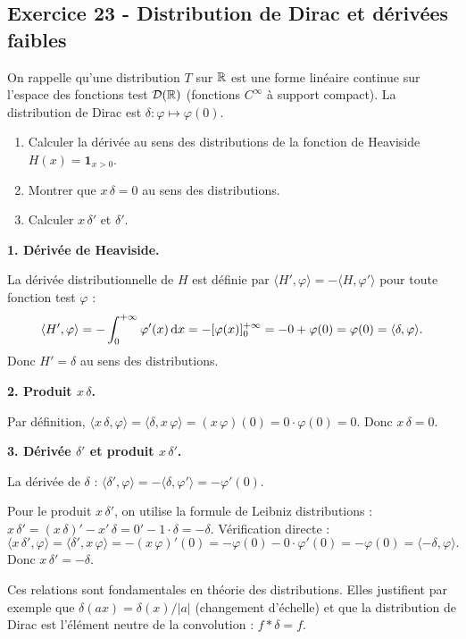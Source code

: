 \documentclass[12pt,a4paper]{article}
\begin{document}
\begin{boitecorrige}
\end{boitecorrige}

\subsection*{Exercice 23 - Distribution de Dirac et dérivées faibles \niveau{\difficile}}

\begin{boiteexercice}
On rappelle qu'une distribution $T$ sur $\mathbb{R}$ est une forme linéaire continue sur l'espace des fonctions test $\mathcal{D}(\mathbb{R})$ (fonctions $C^\infty$ à support compact). La distribution de Dirac est $\delta : \varphi\mapsto\varphi(0)$.
\begin{enumerate}
  \item Calculer la dérivée au sens des distributions de la fonction de Heaviside $H(x) = \mathbf{1}_{x>0}$.
  \item Montrer que $x\,\delta = 0$ au sens des distributions.
  \item Calculer $x\,\delta'$ et $\delta'$.
\end{enumerate}
\end{boiteexercice}

\begin{boitecorrige}

\textbf{1. Dérivée de Heaviside.}

La dérivée distributionnelle de $H$ est définie par $\langle H', \varphi\rangle = -\langle H, \varphi'\rangle$ pour toute fonction test $\varphi$ :
\[
\langle H', \varphi\rangle = -\int_0^{+\infty} \varphi'(x)\,\mathrm{d} x = -[\varphi(x)]_0^{+\infty} = -0 + \varphi(0) = \varphi(0) = \langle\delta, \varphi\rangle.
\]
Donc $H' = \delta$ au sens des distributions.

\textbf{2. Produit $x\,\delta$.}

Par définition, $\langle x\,\delta, \varphi\rangle = \langle\delta, x\,\varphi\rangle = (x\,\varphi)(0) = 0\cdot\varphi(0) = 0$. Donc $x\,\delta = 0$.

\textbf{3. Dérivée $\delta'$ et produit $x\,\delta'$.}

La dérivée de $\delta$ : $\langle\delta', \varphi\rangle = -\langle\delta, \varphi'\rangle = -\varphi'(0)$.

Pour le produit $x\,\delta'$, on utilise la formule de Leibniz distributions : $x\,\delta' = (x\,\delta)' - x'\,\delta = 0' - 1\cdot\delta = -\delta$. Vérification directe :
\[
\langle x\,\delta', \varphi\rangle = \langle\delta', x\,\varphi\rangle = -(x\,\varphi)'(0) = -\varphi(0) - 0\cdot\varphi'(0) = -\varphi(0) = \langle -\delta, \varphi\rangle.
\]
Donc $x\,\delta' = -\delta$.

Ces relations sont fondamentales en théorie des distributions. Elles justifient par exemple que $\delta(ax) = \delta(x)/|a|$ (changement d'échelle) et que la distribution de Dirac est l'élément neutre de la convolution : $f * \delta = f$.

\end{boitecorrige}
\end{document}

